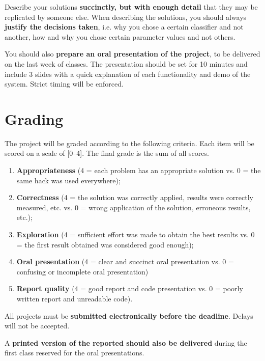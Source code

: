 \documentclass[12pt]{article}
\begin{document}
Describe your solutions \textbf{succinctly, but with enough detail} that they
may be replicated by someone else. When describing the solutions, you should
always \textbf{justify the decisions taken}, i.e. why you chose a certain
classifier and not another, how and why you chose certain parameter values and
not others.

You should also \textbf{prepare an oral presentation of the project}, to be
delivered on the last week of classes. The presentation should be set for 10
minutes and include 3 slides with a quick explanation of each functionality and
demo of the system. Strict timing will be enforced.

\section{Grading}
\label{sec:grading}

The project will be graded according to the following criteria. Each item will
be scored on a scale of [0--4]. The final grade is the sum of all scores.
\begin{enumerate}
\item \textbf{Appropriateness} (4 = each problem has an appropriate solution vs. 0 = the same hack was used everywhere);
\item \textbf{Correctness} (4 = the solution was correctly applied, results were correctly measured, etc. vs. 0 = wrong application of the solution, erroneous results, etc.);
\item \textbf{Exploration} (4 = sufficient effort was made to obtain the best results vs. 0 = the first result obtained was considered good enough);
\item \textbf{Oral presentation} (4 = clear and succinct oral presentation vs. 0 = confusing or incomplete oral presentation)
\item \textbf{Report quality} (4 = good report and code presentation vs. 0 = poorly written report and unreadable code).
\end{enumerate}

All projects must be \textbf{submitted electronically before the
  deadline}. Delays will not be accepted.

A \textbf{printed version of the reported should also be delivered} during the
first class reserved for the oral presentations.
\end{document}
